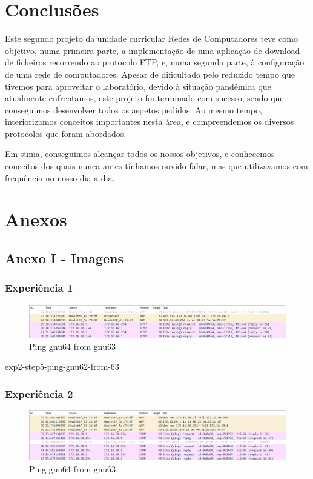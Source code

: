 \documentclass[article, a4paper, 11pt, oneside]{memoir}
\begin{document}
\chapter[Conclusões][Conclusões]{Conclusões} \label{\thechapter}

Este segundo projeto da unidade curricular Redes de Computadores teve como objetivo, numa primeira parte, a implementação de uma aplicação de download de ficheiros recorrendo ao protocolo FTP,
e, numa segunda parte, à configuração de uma rede de computadores. Apesar de dificultado pelo reduzido tempo que tivemos para aproveitar o laboratório, devido à situação pandémica que atualmente enfrentamos,
este projeto foi terminado com sucesso, sendo que conseguimos desenvolver todos os aspetos pedidos.
Ao mesmo tempo, interiorizamos conceitos importantes nesta área, e compreendemos os diversos protocolos que foram abordados.

Em suma, conseguimos alcançar todos os nossos objetivos, e conhecemos conceitos dos quais nunca antes tínhamos ouvido falar, mas que utilizavamos com frequência no nosso dia-a-dia.

\newpage
\chapter[Anexos][Anexos]{Anexos} \label{\thechapter}

\section{Anexo I - Imagens}
\subsection{Experiência 1}

\begin{figure}[h]
	\centering
\includegraphics[scale=0.55]{exp1-gnu63.png}
\caption{Ping gnu64 from gnu63}
\end{figure}

exp2-step5-ping-gnu62-from-63

\subsection{Experiência 2}
\begin{figure}[h]
	\centering
\includegraphics[scale=0.55]{exp2-step5-ping-gnu64-from-gnu63.png}
\caption{Ping gnu64 from gnu63}
\end{figure}
\end{document}
